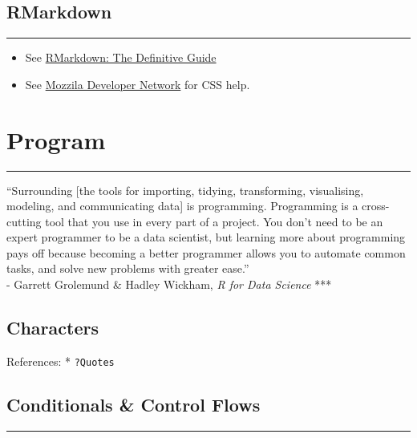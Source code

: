 \documentclass[
]{book}
\providecommand{\tightlist}{%
  \setlength{\itemsep}{0pt}\setlength{\parskip}{0pt}}
\begin{document}
\hypertarget{rmarkdown}{%
\section{RMarkdown}\label{rmarkdown}}

\begin{center}\rule{0.5\linewidth}{0.5pt}\end{center}

\begin{itemize}
\tightlist
\item
  See \href{https://bookdown.org/yihui/rmarkdown/}{RMarkdown: The Definitive Guide}
\item
  See \href{https://developer.mozilla.org/en-US/docs/Web/CSS/CSS_Selectors}{Mozzila Developer Network} for CSS help.
\end{itemize}

\hypertarget{program}{%
\chapter{Program}\label{program}}

\begin{center}\rule{0.5\linewidth}{0.5pt}\end{center}

``Surrounding {[}the tools for importing, tidying, transforming, visualising, modeling, and communicating data{]} is programming. Programming is a cross-cutting tool that you use in every part of a project. You don't need to be an expert programmer to be a data scientist, but learning more about programming pays off because becoming a better programmer allows you to automate common tasks, and solve new problems with greater ease.''\\
- Garrett Grolemund \& Hadley Wickham, \emph{R for Data Science}
***

\hypertarget{characters}{%
\section{Characters}\label{characters}}

References:
* \texttt{?Quotes}

\hypertarget{conditionals-control-flows}{%
\section{Conditionals \& Control Flows}\label{conditionals-control-flows}}

\begin{center}\rule{0.5\linewidth}{0.5pt}\end{center}
\end{document}
